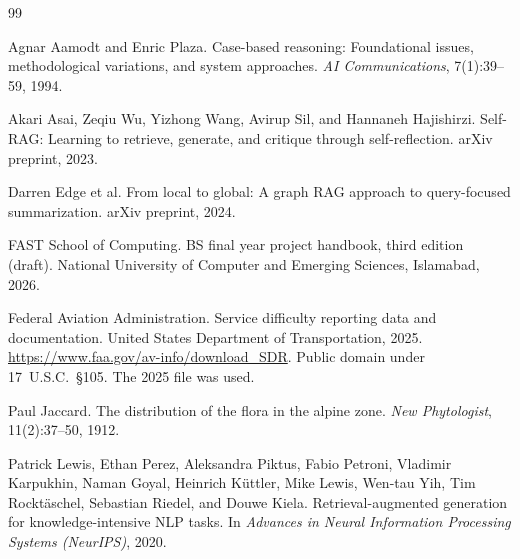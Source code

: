 \begin{thebibliography}{99}

Agnar Aamodt and Enric Plaza.
\newblock Case-based reasoning: Foundational issues, methodological variations, and system approaches.
\newblock \emph{AI Communications}, 7(1):39--59, 1994.

Akari Asai, Zeqiu Wu, Yizhong Wang, Avirup Sil, and Hannaneh Hajishirzi.
\newblock Self-RAG: Learning to retrieve, generate, and critique through self-reflection.
\newblock arXiv preprint, 2023.

Darren Edge et al.
\newblock From local to global: A graph RAG approach to query-focused summarization.
\newblock arXiv preprint, 2024.

FAST School of Computing.
\newblock BS final year project handbook, third edition (draft).
\newblock National University of Computer and Emerging Sciences, Islamabad, 2026.

Federal Aviation Administration.
\newblock Service difficulty reporting data and documentation.
\newblock United States Department of Transportation, 2025.
\newblock \url{https://www.faa.gov/av-info/download_SDR}.
\newblock Public domain under 17~U.S.C.~\S{}105. The 2025 file was used.

Paul Jaccard.
\newblock The distribution of the flora in the alpine zone.
\newblock \emph{New Phytologist}, 11(2):37--50, 1912.

Patrick Lewis, Ethan Perez, Aleksandra Piktus, Fabio Petroni, Vladimir Karpukhin, Naman Goyal, Heinrich K\"uttler, Mike Lewis, Wen-tau Yih, Tim Rockt\"aschel, Sebastian Riedel, and Douwe Kiela.
\newblock Retrieval-augmented generation for knowledge-intensive NLP tasks.
\newblock In \emph{Advances in Neural Information Processing Systems (NeurIPS)}, 2020.

\end{thebibliography}
